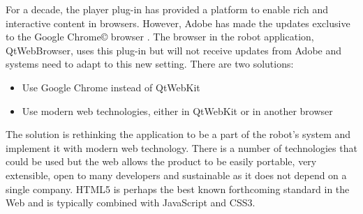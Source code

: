 For a decade, the \flash player plug-in has provided a platform to enable rich and interactive content in browsers.
However, Adobe has made the updates exclusive to the Google Chrome\copyright \xspace browser \cite{FlashRoadmap}. 
The browser in the robot application, QtWebBrowser, uses this plug-in but will not receive updates from Adobe and \company systems need to adapt to this new setting. 
There are two solutions:
\begin{itemize}
	\item Use Google Chrome instead of QtWebKit
	\item Use modern web technologies, either in QtWebKit or in another browser
\end{itemize}

The solution is rethinking the application to be a part of the robot's system and implement it with modern web technology.
There is a number of technologies that could be used but the web allows the product to be easily portable, very extensible, open to many developers and sustainable as it does not depend on a single company.
\ac{HTML5} is perhaps the best known forthcoming standard in the Web and is typically combined with JavaScript and \ac{CSS3}. 
